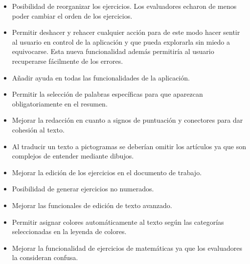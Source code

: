 \begin{itemize}
    \item Posibilidad de reorganizar los ejercicios. Los evaluadores echaron de menos poder cambiar el orden de los ejercicios.
    \item Permitir deshacer y rehacer cualquier acción para de este modo hacer sentir al usuario en control de la aplicación y que pueda explorarla sin miedo a equivocarse. Esta nueva funcionalidad además permitiría al usuario recuperarse fácilmente de los errores.
    \item Añadir ayuda en todas las funcionalidades de la aplicación.
    \item Permitir la selección de palabras específicas para que aparezcan obligatoriamente en el resumen.
    \item Mejorar la redacción en cuanto a signos de puntuación y conectores para dar cohesión al texto.
    \item Al traducir un texto a pictogramas se deberían omitir los artículos ya que son complejos de entender mediante dibujos.
    \item Mejorar la edición de los ejercicios en el documento de trabajo.
    \item Posibilidad de generar ejercicios no numerados.
    \item Mejorar las funcionales de edición de texto avanzado.
    \item Permitir asignar colores automáticamente al texto según las categorías seleccionadas en la leyenda de colores.
    \item Mejorar la funcionalidad de ejercicios de matemáticas ya que los evaluadores la consideran confusa.
\end{itemize}